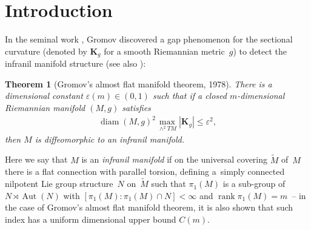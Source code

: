 \documentclass[pdftex]{sigma}
\numberwithin{equation}{section}
\newtheorem{Theorem}{Theorem}[section]
\DeclareMathOperator{\diam}{diam}
\newcommand{\rank}{\operatorname{rank}}
\begin{document}


\renewcommand{\thefootnote}{\arabic{footnote}}
\setcounter{footnote}{0}

\section{Introduction}
In the seminal work \cite{Gromov78b}, Gromov discovered a gap phenomenon for the
sectional curvature (denoted by $\mathbf{K}_g$ for a smooth Riemannian metric~$g$) to detect the infranil manifold structure (see also \cite{BK81, Ruh82}):

\begin{Theorem}[Gromov's almost flat manifold theorem, 1978]\label{thm:
Gromov78}
There is a dimensional constant $\varepsilon(m)\in (0,1)$
such that if a closed $m$-dimensional Riemannian manifold $(M,g)$ satisfies
\begin{gather}\label{eqn: AF_Rm}
\diam(M,g)^2\max_{\wedge^2TM} |\mathbf{K}_{g} | \le \varepsilon^2 ,
\end{gather}
then $M$ is diffeomorphic to an infranil manifold.
\end{Theorem}
Here we say that $M$ is an \emph{infranil manifold} if on the universal covering
$\tilde{M}$ of~$M$ there is a flat connection with parallel torsion, defining a~simply connected nilpotent Lie group structure~$N$ on~$\tilde{M}$ such that
$\pi_1(M)$ is a sub-group of $N\rtimes \operatorname{Aut}(N)$ with
$ [\pi_1(M)\colon \pi_1(M)\cap N ]<\infty$ and $\rank \pi_1(M)=m$~-- in the case of Gromov's
almost flat manifold theorem, it is also shown that such index has a uniform
dimensional upper bound $C(m)$.
\end{document}
